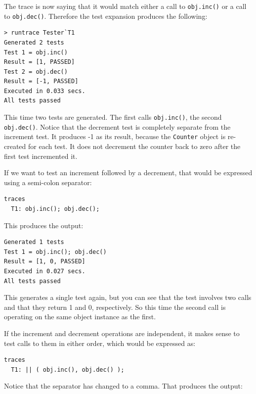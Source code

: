 \documentclass{overturerepchap}
\begin{document}
\noindent The trace is now saying that it would match either a call to \texttt{obj.inc()}
or a call to \texttt{obj.dec()}. Therefore the test expansion produces the
following:

\lstset{style=tool,language=}
\begin{lstlisting}[escapechar=@]
> runtrace Tester`T1
Generated 2 tests
Test 1 = obj.inc()
Result = [1, PASSED]
Test 2 = obj.dec()
Result = [-1, PASSED]
Executed in 0.033 secs. 
All tests passed
\end{lstlisting}
\lstset{style=mystyle}
\lstset{language=VDM++}

\noindent This time two tests are generated. The first calls \texttt{obj.inc()}, the
second \texttt{obj.dec()}. Notice that the decrement test is completely separate
from the increment test. It produces -1 as its result, because the \texttt{Counter}
object is re-created for each test. It does not decrement the counter back to
zero after the first test incremented it.

If we want to test an increment followed by a decrement, that would be expressed
using a semi-colon separator:

\small
\begin{lstlisting}
traces
  T1: obj.inc(); obj.dec();
\end{lstlisting}
\normalsize

\noindent This produces the output:

\small
\lstset{style=tool,language=}
\begin{lstlisting}[escapechar=@]
Generated 1 tests
Test 1 = obj.inc(); obj.dec()
Result = [1, 0, PASSED]
Executed in 0.027 secs. 
All tests passed
\end{lstlisting}
\lstset{style=mystyle}
\lstset{language=VDM++}
\normalsize

\noindent This generates a single test again, but you can see that the test involves two
calls and that they return 1 and 0, respectively. So this time the second call
is operating on the same object instance as the first.

If the increment and decrement operations are independent, it makes sense to
test calls to them in either order, which would be expressed as:

\small
\begin{lstlisting}
traces
  T1: || ( obj.inc(), obj.dec() );
\end{lstlisting}
\normalsize

\noindent Notice that the separator has changed to a comma. That produces the output:
\end{document}

